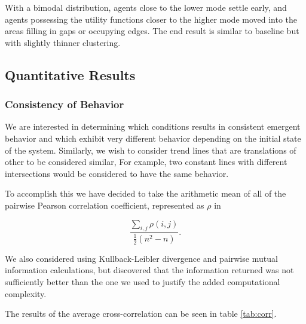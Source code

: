 \documentclass[sigplan,nonacm]{acmart}
\begin{document}
With a bimodal distribution, agents close to the lower mode settle early, and agents possessing the utility functions
closer to the higher mode moved into the areas filling in gaps or occupying edges. 
The end result is similar to baseline but with slightly thinner clustering.

\subsection{Quantitative Results}



\subsubsection{Consistency of Behavior}

We are interested in determining which conditions results in consistent emergent behavior
and which exhibit very different behavior depending on the initial state of the system.
Similarly, we wish to consider trend lines that are translations of other to be considered similar,
For example, two constant lines with different intersections would be considered to have the same behavior.

To accomplish this we have decided to take the arithmetic mean of all of the pairwise 
Pearson correlation coefficient, represented as \(\rho\) in

\begin{equation}
	\frac{\sum_{i,j}\rho(i,j)}{\frac 1 2 (n^2-n)}.
\end{equation}

We also considered using Kullback-Leibler divergence and pairwise mutual information calculations,
but discovered that the information returned was not sufficiently better than the one we used to 
justify the added computational complexity.

The results of the average cross-correlation can be seen in table \ref{tab:corr}.
\end{document}
